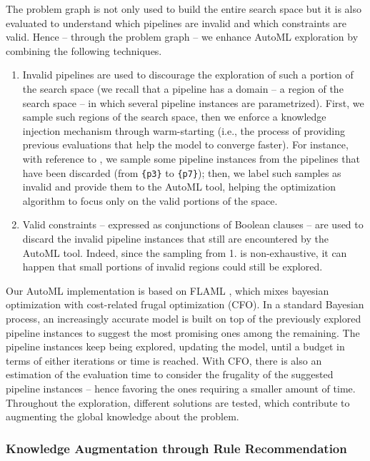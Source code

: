 The problem graph is not only used to build the entire search space but it is also evaluated to understand which pipelines are invalid and which constraints are valid.
Hence -- through the problem graph -- we enhance AutoML exploration by combining the following techniques.
\begin{enumerate}
    \item Invalid pipelines are used to discourage the exploration of such a portion of the search space (we recall that a pipeline has a domain -- a region of the search space -- in which several pipeline instances are parametrized).
    First, we sample such regions of the search space, then we enforce a knowledge injection mechanism through warm-starting (i.e., the process of providing previous evaluations that help the model to converge faster).
    For instance, with reference to , we sample some pipeline instances from the pipelines that have been discarded (from \texttt{\{p3\}} to \texttt{\{p7\}});
    then, we label such samples as invalid and provide them to the AutoML tool, helping the optimization algorithm to focus only on the valid portions of the space.
    \item Valid constraints -- expressed as conjunctions of Boolean clauses -- are used to discard the invalid pipeline instances that still are encountered by the AutoML tool.
    Indeed, since the sampling from 1. is non-exhaustive, it can happen that small portions of invalid regions could still be explored.
\end{enumerate}

Our AutoML implementation is based on FLAML \cite{wang2021flaml}, which mixes bayesian optimization with cost-related frugal optimization (CFO).
In a standard Bayesian process, an increasingly accurate model is built on top of the previously explored pipeline instances to suggest the most promising ones among the remaining.
The pipeline instances keep being explored, updating the model, until a budget in terms of either iterations or time is reached.
With CFO, there is also an estimation of the evaluation time to consider the frugality of the suggested pipeline instances -- hence favoring the ones requiring a smaller amount of time.
Throughout the exploration, different solutions are tested, which contribute to augmenting the global knowledge about the problem.

\subsubsection{Knowledge Augmentation through Rule Recommendation}

